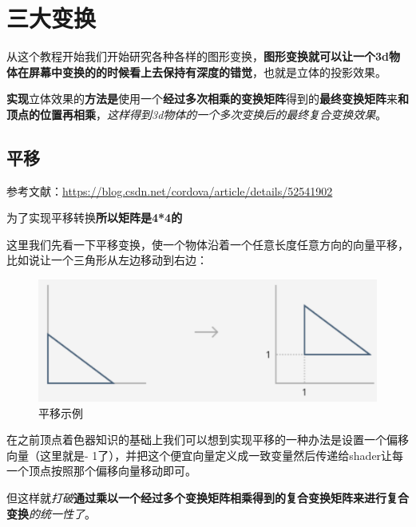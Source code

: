 \documentclass[UTF8,a4paper,12pt]{ctexbook}
\begin{document}
\chapter{三大变换}
	从这个教程开始我们开始研究各种各样的图形变换，\textbf{图形变换就可以让一个3d物体在屏幕中变换的的时候看上去保持有深度的错觉}，也就是立体的投影效果。
	
	\textbf{实现}立体效果的\textbf{方法是}使用一个\textbf{经过多次相乘的变换矩阵}得到的\textbf{最终变换矩阵}来\textbf{和顶点的位置再相乘}，\textit{这样得到3d物体的一个多次变换后的最终复合变换效果}。
	
	\section{平移}
		参考文献：\url{https://blog.csdn.net/cordova/article/details/52541902}
		
		为了实现平移转换\textbf{所以矩阵是4*4的}
		
		
		这里我们先看一下平移变换，使一个物体沿着一个任意长度任意方向的向量平移，比如说让一个三角形从左边移动到右边：
			\begin{figure}[h]
				\centering
				\includegraphics[scale = 0.4]{transfer.png}
				\caption{平移示例}
			\end{figure}

		在之前顶点着色器知识的基础上我们可以想到实现平移的一种办法是设置一个偏移向量（这里就是- 1了），并把这个便宜向量定义成一致变量然后传递给shader让每一个顶点按照那个偏移向量移动即可。
		
		但这样就\textit{打破}\textbf{通过乘以一个经过多个变换矩阵相乘得到的复合变换矩阵来进行复合变换}\textit{的统一性了}。
		 
\end{document}
